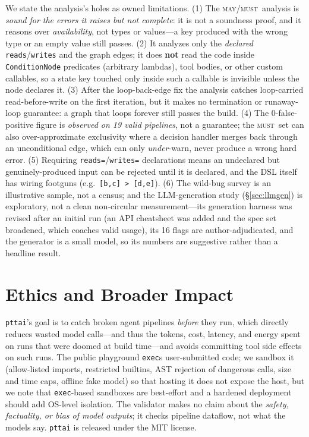 \documentclass[11pt]{article}
\newcommand{\may}{\textsc{may}}
\newcommand{\must}{\textsc{must}}
\newcommand{\code}[1]{\texttt{#1}}
\begin{document}
We state the analysis's holes as owned limitations. (1) The \may/\must\ analysis
is \emph{sound for the errors it raises but not complete}: it is not a soundness
proof, and it reasons over \emph{availability}, not types or values---a key
produced with the wrong type or an empty value still passes. (2) It analyzes only
the \emph{declared} \code{reads}/\code{writes} and the graph edges; it does
\textbf{not} read the code inside \code{ConditionNode} predicates (arbitrary
lambdas), tool bodies, or other custom callables, so a state key touched only
inside such a callable is invisible unless the node declares it. (3) After the
loop-back-edge fix the analysis catches loop-carried read-before-write on the
first iteration, but it makes no termination or runaway-loop guarantee: a graph
that loops forever still passes the build. (4) The 0-false-positive figure is
\emph{observed on 19 valid pipelines}, not a guarantee; the \must\ set can also
over-approximate exclusivity where a decision handler merges back through an
unconditional edge, which can only \emph{under}-warn, never produce a wrong hard
error. (5) Requiring \code{reads=}/\code{writes=} declarations means an undeclared
but genuinely-produced input can be rejected until it is declared, and the DSL
itself has wiring footguns (e.g.\ \code{[b,c] > [d,e]}). (6) The wild-bug survey
is an illustrative sample, not a census; and the LLM-generation study
(\S\ref{sec:llmgen}) is exploratory, not a clean non-circular measurement---its
generation harness was revised after an initial run (an API cheatsheet was added
and the spec set broadened, which coaches valid usage), its 16 flags are
author-adjudicated, and the generator is a small model, so its numbers are
suggestive rather than a headline result.

\section*{Ethics and Broader Impact}

\code{pttai}'s goal is to catch broken agent pipelines \emph{before} they run,
which directly reduces wasted model calls---and thus the tokens, cost, latency,
and energy spent on runs that were doomed at build time---and avoids committing
tool side effects on such runs. The public playground \code{exec}s
user-submitted code; we sandbox it (allow-listed imports, restricted builtins,
AST rejection of dangerous calls, size and time caps, offline fake model) so that
hosting it does not expose the host, but we note that \code{exec}-based sandboxes
are best-effort and a hardened deployment should add OS-level isolation. The
validator makes no claim about the \emph{safety, factuality, or bias of model
outputs}; it checks pipeline dataflow, not what the models say. \code{pttai} is
released under the MIT license.
\end{document}
